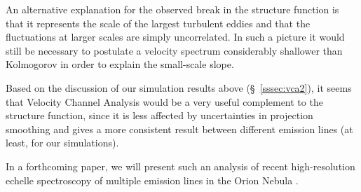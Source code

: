 \documentclass[useAMS,usenatbib]{mn2e}
\begin{document}
An alternative explanation for the observed break in the structure function is that
it represents the scale of the largest turbulent eddies
\citep{1988ApJS...67...93C, 1995ApJ...454..316M}
and that the fluctuations at larger scales are simply uncorrelated.  
In such a picture it would still be necessary to postulate a velocity spectrum
considerably shallower than Kolmogorov in order to explain the small-scale slope. 


Based on the discussion of our simulation results above
(\S~\ref{sssec:vca2}), it seems that Velocity Channel Analysis
would be a very useful complement to the structure function, since it
is less affected by uncertainties in projection smoothing and gives a
more consistent result between different emission lines (at least, for
our simulations).

In a forthcoming paper, we will present such an analysis of recent
high-resolution echelle spectroscopy of multiple emission lines in the Orion Nebula
\citep{2008RMxAA..44..181G, 2008AJ....136.1566O}.
\end{document}
